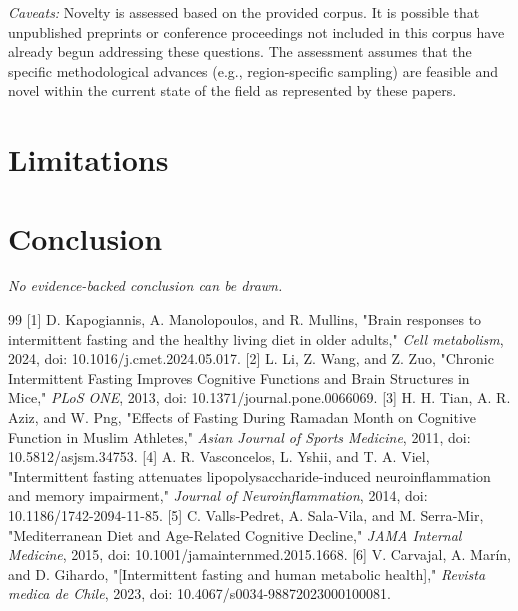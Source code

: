 \documentclass[11pt]{article}
\begin{document}
\textit{Caveats:} Novelty is assessed based on the provided corpus. It is possible that unpublished preprints or conference proceedings not included in this corpus have already begun addressing these questions. The assessment assumes that the specific methodological advances (e.g., region-specific sampling) are feasible and novel within the current state of the field as represented by these papers.

\section{Limitations}
\section{Conclusion}
\textit{No evidence-backed conclusion can be drawn.}

\begin{thebibliography}{99}
 [1] D. Kapogiannis, A. Manolopoulos, and R. Mullins, "Brain responses to intermittent fasting and the healthy living diet in older adults," \textit{Cell metabolism}, 2024, doi: 10.1016/j.cmet.2024.05.017.
 [2] L. Li, Z. Wang, and Z. Zuo, "Chronic Intermittent Fasting Improves Cognitive Functions and Brain Structures in Mice," \textit{PLoS ONE}, 2013, doi: 10.1371/journal.pone.0066069.
 [3] H. H. Tian, A. R. Aziz, and W. Png, "Effects of Fasting During Ramadan Month on Cognitive Function in Muslim Athletes," \textit{Asian Journal of Sports Medicine}, 2011, doi: 10.5812/asjsm.34753.
 [4] A. R. Vasconcelos, L. Yshii, and T. A. Viel, "Intermittent fasting attenuates lipopolysaccharide-induced neuroinflammation and memory impairment," \textit{Journal of Neuroinflammation}, 2014, doi: 10.1186/1742-2094-11-85.
 [5] C. Valls‐Pedret, A. Sala‐Vila, and M. Serra‐Mir, "Mediterranean Diet and Age-Related Cognitive Decline," \textit{JAMA Internal Medicine}, 2015, doi: 10.1001/jamainternmed.2015.1668.
 [6] V. Carvajal, A. Marín, and D. Gihardo, "[Intermittent fasting and human metabolic health]," \textit{Revista medica de Chile}, 2023, doi: 10.4067/s0034-98872023000100081.
\end{thebibliography}
\end{document}
